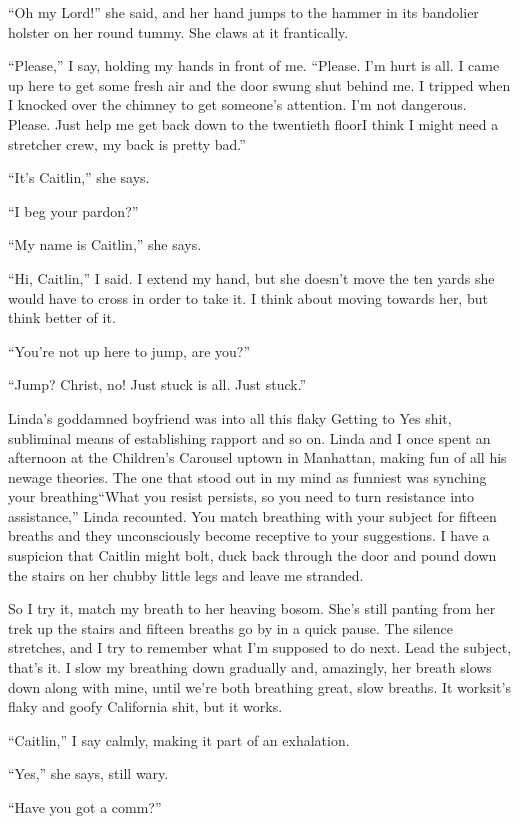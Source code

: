 “Oh my Lord!” she said, and her hand jumps to the hammer in its
bandolier holster on her round tummy. She claws at it frantically.

“Please,” I say, holding my hands in front of me. “Please. I’m hurt
is all. I came up here to get some fresh air and the door swung
shut behind me. I tripped when I knocked over the chimney to get
someone’s attention. I’m not dangerous. Please. Just help me get
back down to the twentieth floor{\dash}I think I might need a stretcher
crew, my back is pretty bad.”

“It’s Caitlin,” she says.

“I beg your pardon?”

“My name is Caitlin,” she says.

“Hi, Caitlin,” I said. I extend my hand, but she doesn’t move the
ten yards she would have to cross in order to take it. I think
about moving towards her, but think better of it.

“You’re not up here to jump, are you?”

“Jump? Christ, no! Just stuck is all. Just stuck.”

Linda’s goddamned boyfriend was into all this flaky Getting to Yes
shit, subliminal means of establishing rapport and so on. Linda and
I once spent an afternoon at the Children’s Carousel uptown in
Manhattan, making fun of all his newage theories. The one that
stood out in my mind as funniest was synching your breathing{\dash}“What
you resist persists, so you need to turn resistance into
assistance,” Linda recounted. You match breathing with your subject
for fifteen breaths and they unconsciously become receptive to your
suggestions. I have a suspicion that Caitlin might bolt, duck back
through the door and pound down the stairs on her chubby little
legs and leave me stranded.

So I try it, match my breath to her heaving bosom. She’s still
panting from her trek up the stairs and fifteen breaths go by in a
quick pause. The silence stretches, and I try to remember what I’m
supposed to do next. Lead the subject, that’s it. I slow my
breathing down gradually and, amazingly, her breath slows down
along with mine, until we’re both breathing great, slow breaths. It
works{\dash}it’s flaky and goofy California shit, but it works.

“Caitlin,” I say calmly, making it part of an exhalation.

“Yes,” she says, still wary.

“Have you got a comm?”

